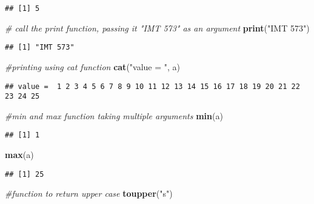 \documentclass[
]{article}
\newenvironment{Shaded}{\begin{snugshade}}{\end{snugshade}}
\newcommand{\CommentTok}[1]{\textcolor[rgb]{0.56,0.35,0.01}{\textit{#1}}}
\newcommand{\KeywordTok}[1]{\textcolor[rgb]{0.13,0.29,0.53}{\textbf{#1}}}
\newcommand{\NormalTok}[1]{#1}
\newcommand{\StringTok}[1]{\textcolor[rgb]{0.31,0.60,0.02}{#1}}
\begin{document}
\begin{verbatim}
## [1] 5
\end{verbatim}

\begin{Shaded}
\begin{Highlighting}[]
\CommentTok{# call the print function, passing it "IMT 573" as an argument}
\KeywordTok{print}\NormalTok{(}\StringTok{"IMT 573"}\NormalTok{)}
\end{Highlighting}
\end{Shaded}

\begin{verbatim}
## [1] "IMT 573"
\end{verbatim}

\begin{Shaded}
\begin{Highlighting}[]
\CommentTok{#printing using cat function}
\KeywordTok{cat}\NormalTok{(}\StringTok{"value = "}\NormalTok{, a)}
\end{Highlighting}
\end{Shaded}

\begin{verbatim}
## value =  1 2 3 4 5 6 7 8 9 10 11 12 13 14 15 16 17 18 19 20 21 22 23 24 25
\end{verbatim}

\begin{Shaded}
\begin{Highlighting}[]
\CommentTok{#min and max function taking multiple arguments}
\KeywordTok{min}\NormalTok{(a)}
\end{Highlighting}
\end{Shaded}

\begin{verbatim}
## [1] 1
\end{verbatim}

\begin{Shaded}
\begin{Highlighting}[]
\KeywordTok{max}\NormalTok{(a)}
\end{Highlighting}
\end{Shaded}

\begin{verbatim}
## [1] 25
\end{verbatim}

\begin{Shaded}
\begin{Highlighting}[]
\CommentTok{#function to return upper case}
\KeywordTok{toupper}\NormalTok{(}\StringTok{"s"}\NormalTok{)}
\end{Highlighting}
\end{Shaded}
\end{document}
